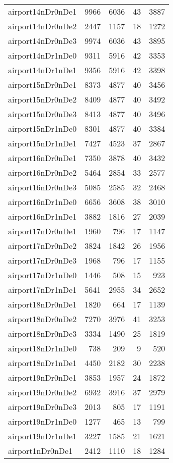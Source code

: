\documentclass[../../../thesis.tex]{subfiles}
\begin{document}
\begin{longtable}{lrrrr}
airport14nDr0nDe1 & 9966 & 6036 & 43 & 3887 \\
airport14nDr0nDe2 & 2447 & 1157 & 18 & 1272 \\
airport14nDr0nDe3 & 9974 & 6036 & 43 & 3895 \\
airport14nDr1nDe0 & 9311 & 5916 & 42 & 3353 \\
airport14nDr1nDe1 & 9356 & 5916 & 42 & 3398 \\
airport15nDr0nDe1 & 8373 & 4877 & 40 & 3456 \\
airport15nDr0nDe2 & 8409 & 4877 & 40 & 3492 \\
airport15nDr0nDe3 & 8413 & 4877 & 40 & 3496 \\
airport15nDr1nDe0 & 8301 & 4877 & 40 & 3384 \\
airport15nDr1nDe1 & 7427 & 4523 & 37 & 2867 \\
airport16nDr0nDe1 & 7350 & 3878 & 40 & 3432 \\
airport16nDr0nDe2 & 5464 & 2854 & 33 & 2577 \\
airport16nDr0nDe3 & 5085 & 2585 & 32 & 2468 \\
airport16nDr1nDe0 & 6656 & 3608 & 38 & 3010 \\
airport16nDr1nDe1 & 3882 & 1816 & 27 & 2039 \\
airport17nDr0nDe1 & 1960 & 796 & 17 & 1147 \\
airport17nDr0nDe2 & 3824 & 1842 & 26 & 1956 \\
airport17nDr0nDe3 & 1968 & 796 & 17 & 1155 \\
airport17nDr1nDe0 & 1446 & 508 & 15 & 923 \\
airport17nDr1nDe1 & 5641 & 2955 & 34 & 2652 \\
airport18nDr0nDe1 & 1820 & 664 & 17 & 1139 \\
airport18nDr0nDe2 & 7270 & 3976 & 41 & 3253 \\
airport18nDr0nDe3 & 3334 & 1490 & 25 & 1819 \\
airport18nDr1nDe0 & 738 & 209 & 9 & 520 \\
airport18nDr1nDe1 & 4450 & 2182 & 30 & 2238 \\
airport19nDr0nDe1 & 3853 & 1957 & 24 & 1872 \\
airport19nDr0nDe2 & 6932 & 3916 & 37 & 2979 \\
airport19nDr0nDe3 & 2013 & 805 & 17 & 1191 \\
airport19nDr1nDe0 & 1277 & 465 & 13 & 799 \\
airport19nDr1nDe1 & 3227 & 1585 & 21 & 1621 \\
airport1nDr0nDe1 & 2412 & 1110 & 18 & 1284 \\

\end{longtable}
\end{document}
